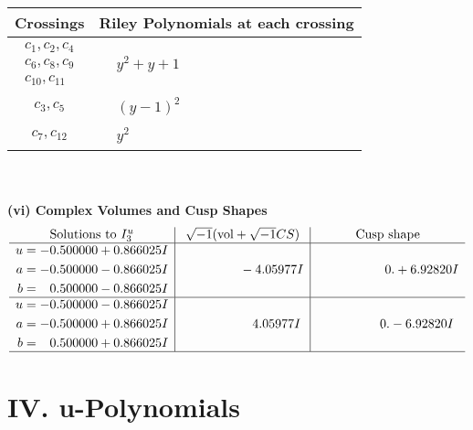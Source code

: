 \documentclass[1p]{elsarticle_modified}
\theoremstyle{definition}
\newcommand{\I}{\sqrt{-1}}
\begin{document}
\begin{tabular}{m{50pt}|m{274pt}}
Crossings & \hspace{64pt}Riley Polynomials at each crossing \\
\hline $$\begin{aligned}c_{1},c_{2},c_{4}\\c_{6},c_{8},c_{9}\\c_{10},c_{11}\end{aligned}$$&$\begin{aligned}
&y^2+y+1
\end{aligned}$\\
\hline $$\begin{aligned}c_{3},c_{5}\end{aligned}$$&$\begin{aligned}
&(y-1)^2
\end{aligned}$\\
\hline $$\begin{aligned}c_{7},c_{12}\end{aligned}$$&$\begin{aligned}
&y^2
\end{aligned}$\\
\hline
\end{tabular}\\~\\
\newpage\flushleft \textbf{(vi) Complex Volumes and Cusp Shapes}
$$\begin{array}{c|c|c}  
\text{Solutions to }I^u_{3}& \I (\text{vol} + \sqrt{-1}CS) & \text{Cusp shape}\\
 \hline 
\begin{aligned}
u &= -0.500000 + 0.866025 I \\
a &= -0.500000 - 0.866025 I \\
b &= \phantom{-}0.500000 - 0.866025 I\end{aligned}
 & \phantom{-0.000000 } -4.05977 I & \phantom{-0.000000 -}0. + 6.92820 I \\ \hline\begin{aligned}
u &= -0.500000 - 0.866025 I \\
a &= -0.500000 + 0.866025 I \\
b &= \phantom{-}0.500000 + 0.866025 I\end{aligned}
 & \phantom{-0.000000 -}4.05977 I & \phantom{-0.000000 } 0. - 6.92820 I\\
 \hline 
 \end{array}$$\newpage
\newpage\renewcommand{\arraystretch}{1}
\centering \section*{ IV. u-Polynomials}
\end{document}
